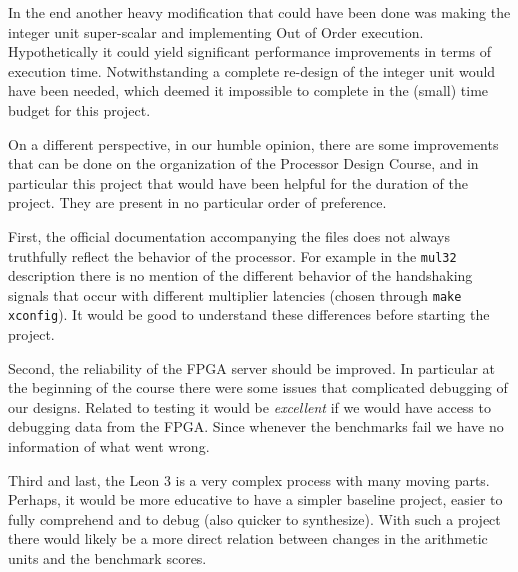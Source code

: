 In the end another heavy modification that could have been done was making the
integer unit super-scalar and implementing Out of Order execution. Hypothetically it could yield 
significant performance improvements in terms of execution time. Notwithstanding a complete re-design of the integer unit
would have been needed, which deemed it impossible to complete in the (small) time budget for this project.


On a different perspective, in our humble opinion, there are some improvements that can be done on the organization of the Processor Design Course, and in particular this project that would have been helpful for the duration of the project. They are present in no particular order of preference.

First, the official documentation accompanying the files does not always truthfully reflect the behavior of the processor. For example in the \texttt{mul32} description there is no mention of the different behavior of the handshaking signals that occur with different multiplier latencies (chosen through \texttt{make xconfig}). It would be good to understand these differences before starting the project.

Second, the reliability of the FPGA server should be improved. In particular at the beginning of the course there were some issues that complicated debugging of our designs. Related to testing it would be \emph{excellent} if we would have access to debugging data from the FPGA. Since whenever the benchmarks fail we have no information of what went wrong.

Third and last, the Leon 3 is a very complex process with many moving parts. Perhaps, it would be more educative to have a simpler baseline project, easier to fully comprehend and to debug (also quicker to synthesize). With such a project there would likely be a more direct relation between changes in the arithmetic units and the benchmark scores.

